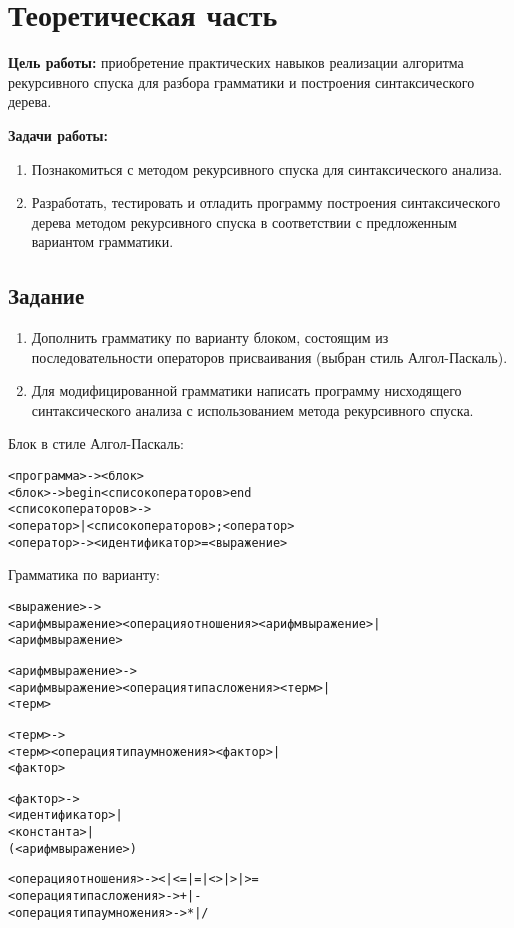 \section{Теоретическая часть}

\textbf{Цель работы:} приобретение практических навыков реализации алгоритма рекурсивного спуска для разбора грамматики и построения синтаксического дерева.

\textbf{Задачи работы:}

\begin{enumerate}
	\item Познакомиться с методом рекурсивного спуска для синтаксического анализа.
	\item Разработать, тестировать и отладить программу построения синтаксического дерева методом рекурсивного спуска в соответствии с предложенным вариантом грамматики.
\end{enumerate}

\subsection{Задание}

\begin{enumerate}
	\item Дополнить грамматику по варианту блоком, состоящим из последовательности операторов присваивания (выбран стиль Алгол-Паскаль).
	\item Для модифицированной грамматики написать программу нисходящего синтаксического анализа с использованием метода рекурсивного спуска.
\end{enumerate}

Блок в стиле Алгол-Паскаль:
   
\begin{framed}
\ttfamily 
\begin{alltt}
<программа> -> <блок>
<блок> -> begin <список операторов> end
<список операторов> -> 
        <оператор> | <список операторов> ; <оператор> 
<оператор> -> <идентификатор> = <выражение>
\end{alltt}
\end{framed}

Грамматика по варианту:

\begin{framed}
\ttfamily 
\begin{alltt}
<выражение> -> 
    <арифм выражение> <операция отношения> <арифм выражение> | 
    <арифм выражение> 

<арифм выражение> -> 
    <арифм выражение> <операция типа сложения> <терм> | 
    <терм> 

<терм> -> 
    <терм> <операция типа умножения> <фактор> | 
    <фактор> 

<фактор> -> 
    <идентификатор> | 
    <константа> | 
    ( <арифм выражение> ) 

<операция отношения> -> < | <= | = | <> | > | >= 
<операция типа сложения> -> + | - 
<операция типа умножения> -> * | / 
\end{alltt}
\end{framed}

